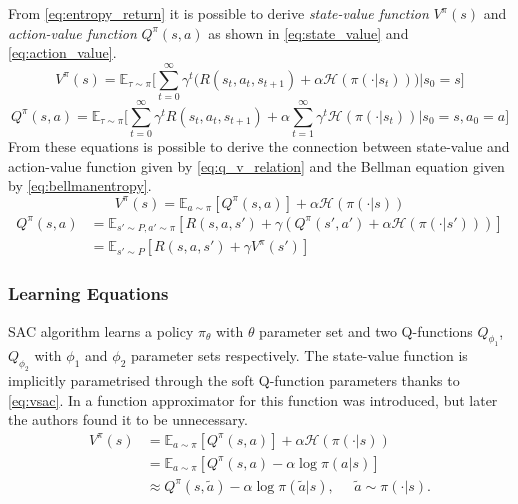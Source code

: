 From \vref{eq:entropy_return} it is possible to derive \textit{state-value function} $V^\pi(s)$ and \textit{action-value function} $Q^\pi(s,a)$ as shown in \vref{eq:state_value} and \vref{eq:action_value}.
\begin{equation} \label{eq:state_value}
	V^\pi(s) = \mathbb{E}_{\tau \sim \pi}\Bigg[\sum_{t=0}^{\infty} \gamma^t \bigg(R(s_t, a_t, s_{t+1}) + \alpha \mathcal{H}(\pi(\cdot|s_t))\bigg)\bigg|s_0 = s\Bigg]
\end{equation}
\begin{equation} \label{eq:action_value}
	Q^\pi(s,a) = \mathbb{E}_{\tau \sim \pi}\Bigg[\sum_{t=0}^{\infty} \gamma^t R(s_t, a_t, s_{t+1}) + \alpha \sum_{t=1}^{\infty} \gamma^t \mathcal{H}(\pi(\cdot|s_t))\bigg|s_0 = s, a_0 =a\Bigg]
\end{equation}
From these equations is possible to derive the connection between state-value and action-value function given by \vref{eq:q_v_relation} and the Bellman equation given by \vref{eq:bellmanentropy}.
\begin{equation} \label{eq:q_v_relation}
	V^\pi(s) = \mathbb{E}_{a\sim\pi}[Q^\pi(s,a)] + \alpha \mathcal{H}(\pi(\cdot|s))
\end{equation}
\begin{equation}
	\begin{aligned} 	\label{eq:bellmanentropy}
		Q^\pi(s,a) & = \mathbb{E}_{s'\sim P, a'\sim\pi}[R(s,a,s') + \gamma(Q^\pi(s',a') + \alpha \mathcal{H}(\pi(\cdot|s')))] \\
		           & = \mathbb{E}_{s'\sim P}[R(s,a,s') + \gamma V^\pi(s')]
	\end{aligned}
\end{equation}

\subsubsection{Learning Equations}
SAC algorithm learns a policy $\pi_\theta$ with $\theta$ parameter set and two Q-functions $Q_{\phi_1}$,  $Q_{\phi_2}$ with $\phi_1$ and $\phi_2$ parameter sets respectively.
The state-value function is implicitly parametrised through the soft Q-function parameters thanks to \vref{eq:vsac}.
In \cite{haarnoja2018soft} a function approximator for this function was introduced, but later \cite{haarnoja2018alg} the authors found it to be unnecessary.
\begin{equation} \label{eq:vsac}
	\begin{aligned}
		V^{\pi}(s) & = \mathbb{E}_{a \sim \pi}[Q^{\pi}(s,a)] + \alpha \mathcal{H} \left(\pi(\cdot|s)\right)               \\
		           & = \mathbb{E}_{a \sim \pi}[Q^{\pi}(s,a) - \alpha \log \pi(a|s)]                                       \\
		           & \approx Q^{\pi}(s,\tilde{a}) - \alpha \log \pi(\tilde{a}|s), \;\;\;\;\; \tilde{a} \sim \pi(\cdot|s).
	\end{aligned}
\end{equation}

